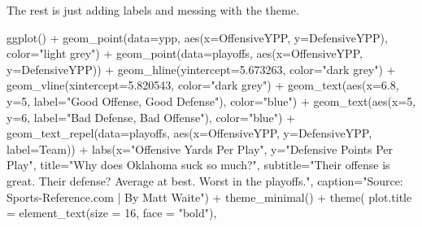 \documentclass[
]{book}
\newenvironment{Shaded}{\begin{snugshade}}{\end{snugshade}}
\newcommand{\AttributeTok}[1]{\textcolor[rgb]{0.77,0.63,0.00}{#1}}
\newcommand{\DecValTok}[1]{\textcolor[rgb]{0.00,0.00,0.81}{#1}}
\newcommand{\FloatTok}[1]{\textcolor[rgb]{0.00,0.00,0.81}{#1}}
\newcommand{\FunctionTok}[1]{\textcolor[rgb]{0.00,0.00,0.00}{#1}}
\newcommand{\NormalTok}[1]{#1}
\newcommand{\SpecialCharTok}[1]{\textcolor[rgb]{0.00,0.00,0.00}{#1}}
\newcommand{\StringTok}[1]{\textcolor[rgb]{0.31,0.60,0.02}{#1}}
\begin{document}
The rest is just adding labels and messing with the theme.

\begin{Shaded}
\begin{Highlighting}[]
\FunctionTok{ggplot}\NormalTok{() }\SpecialCharTok{+} 
  \FunctionTok{geom\_point}\NormalTok{(}\AttributeTok{data=}\NormalTok{ypp, }\FunctionTok{aes}\NormalTok{(}\AttributeTok{x=}\NormalTok{OffensiveYPP, }\AttributeTok{y=}\NormalTok{DefensiveYPP), }\AttributeTok{color=}\StringTok{"light grey"}\NormalTok{) }\SpecialCharTok{+}
  \FunctionTok{geom\_point}\NormalTok{(}\AttributeTok{data=}\NormalTok{playoffs, }\FunctionTok{aes}\NormalTok{(}\AttributeTok{x=}\NormalTok{OffensiveYPP, }\AttributeTok{y=}\NormalTok{DefensiveYPP)) }\SpecialCharTok{+}
  \FunctionTok{geom\_hline}\NormalTok{(}\AttributeTok{yintercept=}\FloatTok{5.673263}\NormalTok{, }\AttributeTok{color=}\StringTok{"dark grey"}\NormalTok{) }\SpecialCharTok{+} 
  \FunctionTok{geom\_vline}\NormalTok{(}\AttributeTok{xintercept=}\FloatTok{5.820543}\NormalTok{, }\AttributeTok{color=}\StringTok{"dark grey"}\NormalTok{) }\SpecialCharTok{+} 
  \FunctionTok{geom\_text}\NormalTok{(}\FunctionTok{aes}\NormalTok{(}\AttributeTok{x=}\FloatTok{6.8}\NormalTok{, }\AttributeTok{y=}\DecValTok{5}\NormalTok{, }\AttributeTok{label=}\StringTok{"Good Offense, Good Defense"}\NormalTok{), }\AttributeTok{color=}\StringTok{"blue"}\NormalTok{) }\SpecialCharTok{+}
  \FunctionTok{geom\_text}\NormalTok{(}\FunctionTok{aes}\NormalTok{(}\AttributeTok{x=}\DecValTok{5}\NormalTok{, }\AttributeTok{y=}\DecValTok{6}\NormalTok{, }\AttributeTok{label=}\StringTok{"Bad Defense, Bad Offense"}\NormalTok{), }\AttributeTok{color=}\StringTok{"blue"}\NormalTok{) }\SpecialCharTok{+}
  \FunctionTok{geom\_text\_repel}\NormalTok{(}\AttributeTok{data=}\NormalTok{playoffs, }\FunctionTok{aes}\NormalTok{(}\AttributeTok{x=}\NormalTok{OffensiveYPP, }\AttributeTok{y=}\NormalTok{DefensiveYPP, }\AttributeTok{label=}\NormalTok{Team)) }\SpecialCharTok{+}
  \FunctionTok{labs}\NormalTok{(}\AttributeTok{x=}\StringTok{"Offensive Yards Per Play"}\NormalTok{, }\AttributeTok{y=}\StringTok{"Defensive Points Per Play"}\NormalTok{, }\AttributeTok{title=}\StringTok{"Why does Oklahoma suck so much?"}\NormalTok{, }\AttributeTok{subtitle=}\StringTok{"Their offense is great. Their defense? Average at best. Worst in the playoffs."}\NormalTok{, }\AttributeTok{caption=}\StringTok{"Source: Sports{-}Reference.com | By Matt Waite"}\NormalTok{) }\SpecialCharTok{+}
  \FunctionTok{theme\_minimal}\NormalTok{() }\SpecialCharTok{+} 
  \FunctionTok{theme}\NormalTok{(}
    \AttributeTok{plot.title =} \FunctionTok{element\_text}\NormalTok{(}\AttributeTok{size =} \DecValTok{16}\NormalTok{, }\AttributeTok{face =} \StringTok{"bold"}\NormalTok{),}

\end{Highlighting}
\end{Shaded}
\end{document}
